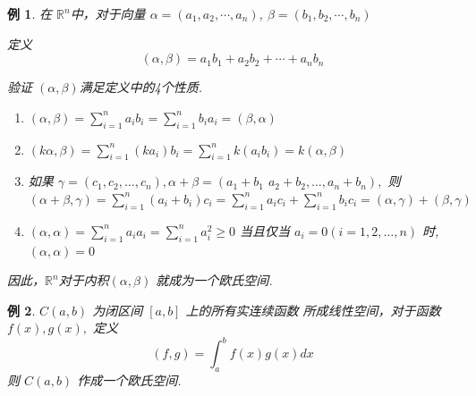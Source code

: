 \documentclass[13pt]{beamer}
\newtheorem{exa}{例}
\begin{document}
\begin{frame}
\begin{exa}
在  $\mathbb{R}^n$中，对于向量 
$\alpha=\left( a_{1}, a_{2}, \cdots, a_{n}\right)$, $\beta=\left(b_{1}, b_{2}, \cdots, b_{n}\right)$

定义$$(\alpha, \beta)=a_{1} b_{1}+a_{2} b_{2}+\cdots+a_{n} b_{n}$$

验证 $(\alpha, \beta)$满足定义中的4个性质. 
\begin{enumerate}
	\item   $(\alpha, \beta)=\sum_{i=1}^{n} a_{i} b_{i}=\sum_{i=1}^{n} b_{i} a_{i}=(\beta, \alpha)$
	\item  $(k \alpha, \beta)=\sum_{i=1}^{n}\left(k a_{i}\right) b_{i}=\sum_{i=1}^{n} k\left(a_{i} b_{i}\right)=k(\alpha, \beta)$
	\item 如果 $\gamma=\left(c_{1}, c_{2}, \ldots, c_{n}\right), \alpha + \beta =\left(a_{1}+b_{1}\right.$
	$\left.a_{2}+b_{2}, \ldots, a_{n}+b_{n}\right),$ 则
	$(\alpha+\beta, \gamma)=\sum_{i=1}^{n}\left(a_{i}+b_{i}\right) c_{i}=\sum_{i=1}^{n} a_{i} c_{i}+\sum_{i=1}^{n} b_{i} c_{i}=(\alpha, \gamma)+(\beta, \gamma)$
	\item $(\alpha, \alpha)=\sum_{i=1}^{n} a_{i} a_{i}=\sum_{i=1}^{n} a_{i}^{2} \geq 0$ 
	当且仅当 $a_{i}=0(i=1,2, \dots, n)$ 时, $(\alpha, \alpha)=0$
\end{enumerate}

因此，$\mathbb{R}^n$对于内积$(\alpha, \beta)$ 就成为一个欧氏空间.
\end{exa}

\end{frame}


\begin{frame}
\begin{exa}
${C}({a}, {b})$ 为闭区间 $[{a}, {b}]$ 上的所有实连续函数
所成线性空间，对于函数 $f(x), g(x),$ 定义
\[
(f, g)=\int_{a}^{b} f(x) g(x) d x
\]
则 $C(a, b)$ 作成一个欧氏空间.
\end{exa}
\end{frame}
 
\end{document}
